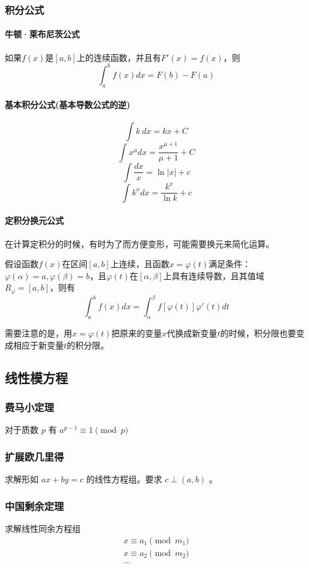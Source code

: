 \documentclass[UTF-8]{ctexart}
\begin{document}
	\subsubsection{积分公式}
	\paragraph{牛顿·莱布尼茨公式}如果$f(x)$是$[a,b]$上的连续函数，并且有$F'(x)=f(x)$，则$$\int _ a^b f(x)dx=F(b)-F(a)$$
	\paragraph{基本积分公式(基本导数公式的逆)}
	$$\int k\ dx=kx+C$$
	$$\int x^\mu dx=\frac{x^{\mu+1}}{\mu+1}+C$$
	$$\int \frac{dx}{x}=\ln |x|+c$$
	$$\int k^x dx=\frac{k^x}{\ln k}+c$$
	\paragraph{定积分换元公式}	在计算定积分的时候，有时为了而方便变形，可能需要换元来简化运算。  
	
	假设函数$f(x)$在区间$[a,b]$上连续，且函数$x=\varphi(t)$满足条件：$\varphi(\alpha)=a,\varphi(\beta)=b$，且$\varphi(t)$在$[\alpha,\beta]$上具有连续导数，且其值域$R_\varphi=[a,b]$，则有  
	$$\int _ a^b f(x)dx=\int _ {\alpha}^{\beta} f[\varphi(t)]\varphi'(t)dt$$  
	
	需要注意的是，用$x=\varphi(t)$把原来的变量$x$代换成新变量$t$的时候，积分限也要变成相应于新变量$t$的积分限。
	\subsection{线性模方程}
	\subsubsection{费马小定理}
	对于质数 $p$ 有 $a^{p-1} \equiv 1 \pmod p$
	\subsubsection{扩展欧几里得}
	求解形如 $ax+by=c$ 的线性方程组。要求 $c \perp (a,b)$ 。
	\subsubsection{中国剩余定理}
	求解线性同余方程组 
	\begin{align}
	x \equiv a _ 1 \pmod m _ 1 \nonumber\\ 
	x \equiv a _ 2 \pmod m _ 2 \nonumber\\
	\dots\nonumber
	\end{align}
	
\end{document}
